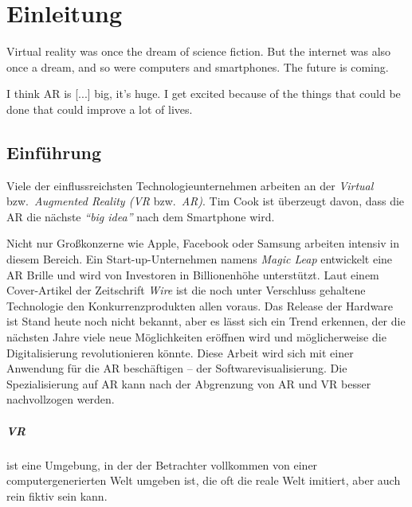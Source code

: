 \chapter{Einleitung}

\begin{fquote}
Virtual reality was once the dream of science fiction. But the internet was also once a dream, and so were computers and smartphones. The future is coming.
\end{fquote}

\begin{fquote}
I think AR is [...] big, it’s huge. I get excited because of the things that could be done that could improve a lot of lives.
\end{fquote}

\section{Einführung}
Viele der einflussreichsten Technologieunternehmen arbeiten an der \emph{Virtual} bzw.\ \emph{Augmented Reality (VR} bzw.\ \emph{AR)}. Tim Cook ist überzeugt davon, dass die AR die nächste \emph{``big idea''} nach dem Smartphone wird. \cite{theindependent2017apple}

Nicht nur Großkonzerne wie Apple, Facebook oder Samsung arbeiten intensiv in diesem Bereich. Ein Start-up-Unternehmen namens \emph{Magic Leap} entwickelt eine AR Brille und wird von Investoren in Billionenhöhe unterstützt. \cite{kelly2016untold} Laut einem Cover-Artikel der Zeitschrift \emph{Wire} ist die noch unter Verschluss gehaltene Technologie den Konkurrenzprodukten allen voraus. Das Release der Hardware ist Stand heute noch nicht bekannt, aber es lässt sich ein Trend erkennen, der die nächsten Jahre viele neue Möglichkeiten eröffnen wird und möglicherweise die Digitalisierung revolutionieren könnte.
Diese Arbeit wird sich mit einer Anwendung für die AR beschäftigen -- der Softwarevisualisierung. Die Spezialisierung auf AR kann nach der Abgrenzung von AR und VR besser nachvollzogen werden.

\paragraph{VR} ist eine Umgebung, in der der Betrachter vollkommen von einer computergenerierten Welt umgeben ist, die oft die reale Welt imitiert, aber auch rein fiktiv sein kann. \cite{milgram1995augmented}\\

